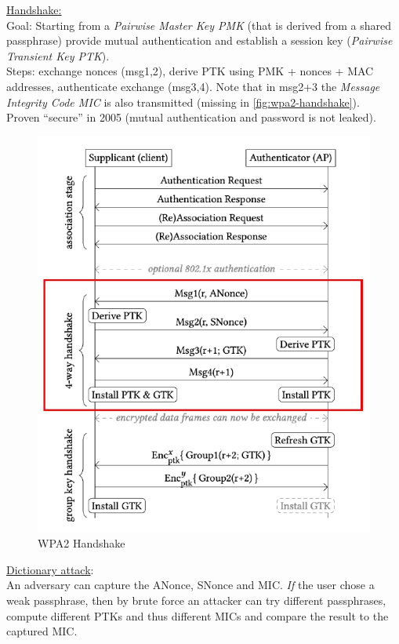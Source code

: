 \underline{Handshake:}\\
Goal: Starting from a \textit{Pairwise Master Key PMK} (that is derived from a shared passphrase) provide mutual authentication and establish a session key (\textit{Pairwise Transient Key PTK}).
\\
Steps: exchange nonces (msg1,2), derive PTK using PMK + nonces + MAC addresses, authenticate exchange (msg3,4).
Note that in msg2+3 the \textit{Message Integrity Code MIC} is also transmitted (missing in \autoref{fig:wpa2-handshake}).
\\
Proven ``secure'' in 2005 (mutual authentication and password is not leaked).

\begin{figure}
	\centering
	\includegraphics[scale=0.6]{images/9-wpa2-handshake.png}
	\caption{WPA2 Handshake}
	\label{fig:wpa2-handshake}
\end{figure}

\underline{Dictionary attack}: \\
An adversary can capture the ANonce, SNonce and MIC.
\textit{If} the user chose a weak passphrase, then by brute force an attacker can try different passphrases, compute different PTKs and thus different MICs and compare the result to the captured MIC.


